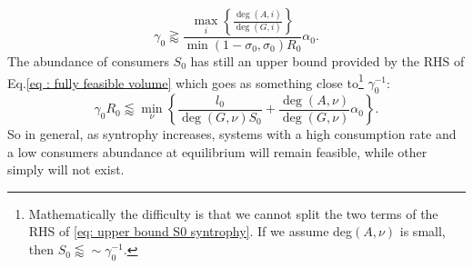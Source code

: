 \documentclass[12pt, titlepage]{report}
\begin{document}
  \begin{equation}
  \gamma_0 \gtrapprox \frac{\max_i\left\{\frac{\deg(A,i)}{\deg(G,i)}\right\}}{\min(1-\sigma_0, \sigma_0) R_0} \alpha_0.
  \end{equation}
  The abundance of consumers $S_0$ has still an upper bound provided by the RHS of Eq.\eqref{eq : fully feasible volume} which goes as something close to\footnote{Mathematically the difficulty is that we cannot split the two terms of the RHS of \eqref{eq: upper bound S0 syntrophy}. If we assume deg$(A,\nu)$ is small, then $S_0 \lessapprox \sim \gamma_0^{-1}$.} $\gamma_0^{-1}$:
  \begin{equation}
 \gamma_0 R_0
  \lessapprox
   \min_\nu \left\{ \frac{l_0}{\deg(G,\nu) S_0} + \frac{\deg(A,\nu)}{\deg(G,\nu)}\alpha_0\right\}.\label{eq: upper bound S0 syntrophy}
  \end{equation}
  So in general, as syntrophy increases, systems with a high consumption rate and a low consumers abundance at equilibrium will remain feasible, while other simply will not exist. %
\end{document}

